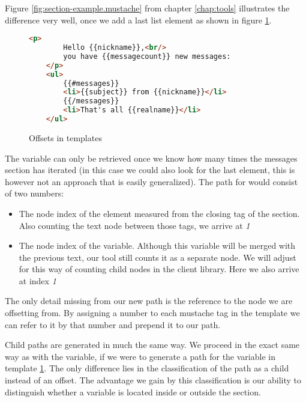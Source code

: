 \documentclass[thesis.tex]{subfiles}
\begin{document}
Figure \ref{fig:section-example.mustache} from chapter \ref{chap:tools}
illustrates the difference very well, once we add a last list element as
shown in figure \ref{fig:offsets.mustache}.
\begin{figure}
	\centering
	\begin{lstlisting}[language=HTML]
	<p>
		Hello {{nickname}},<br/>
		you have {{messagecount}} new messages:
	</p>
	<ul>
		{{#messages}}
		<li>{{subject}} from {{nickname}}</li>
		{{/messages}}
		<li>That's all {{realname}}</li>
	</ul>
	\end{lstlisting}
	\caption{Offsets in templates}
	\label{fig:offsets.mustache}
\end{figure}
The  variable can only be retrieved once we know how
many times the messages section has iterated (in this case we could also look
for the last  element, this is however not an approach that is
easily generalized). The path for  would consist of
two numbers:
\begin{itemize}
\item The node index of the  element measured from
      the closing tag of the  section.
      Also counting the text node between those tags, we arrive at \emph{1}
\item The node index of the  variable. Although this
      variable will be merged with the previous text, our tool still counts it
      as a separate node. We will adjust for this way of counting child nodes in
      the client library. Here we also arrive at index \emph{1}
\end{itemize}

The only detail missing from our new path is the reference to the node we are
offsetting from. By assigning a number to each mustache tag in the template we
can refer to it by that number and prepend it to our path.

Child paths are generated in much the same way. We proceed in the exact same way
as with the  variable, if we were to generate a path
for the  variable in template \ref{fig:offsets.mustache}.
The only difference lies in the classification of the path as a child instead of
an offset.
The advantage we gain by this classification is our ability to distinguish
whether a variable is located inside or outside the section.
\end{document}
